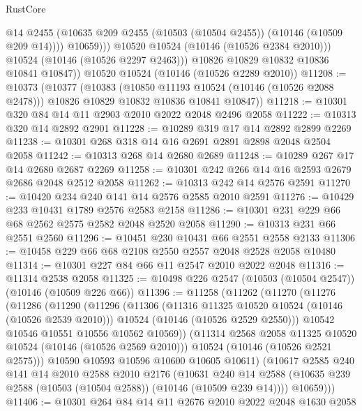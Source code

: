 \begin{lexlean}{RustCore}
\begin{coremodule}
                    @14
                    @2455
                    (@10635 @209 @2455 (@10503 (@10504 @2455)) (@10146 (@10509 @209 @14))))
                  @10659)))
            @10520
            @10524
            (@10146 (@10526 @2384 @2010)))
          @10524
          (@10146 (@10526 @2297 @2463)))
        @10826
        @10829
        @10832
        @10836
        @10841
        @10847))
    @10520
    @10524
    (@10146 (@10526 @2289 @2010))
@11208 := @10373
    (@10377
      (@10383
        (@10850 @11193 @10524 (@10146 (@10526 @2088 @2478)))
        @10826
        @10829
        @10832
        @10836
        @10841
        @10847))
@11218 := @10301 @320 @84 @14 @11 @2903 @2010 @2022 @2048 @2496 @2058
@11222 := @10313 @320 @14 @2892 @2901
@11228 := @10289 @319 @17 @14 @2892 @2899 @2269
@11238 := @10301 @268 @318 @14 @16 @2691 @2891 @2898 @2048 @2504 @2058
@11242 := @10313 @268 @14 @2680 @2689
@11248 := @10289 @267 @17 @14 @2680 @2687 @2269
@11258 := @10301 @242 @266 @14 @16 @2593 @2679 @2686 @2048 @2512 @2058
@11262 := @10313 @242 @14 @2576 @2591
@11270 := @10420 @234 @240 @141 @14 @2576 @2585 @2010 @2591
@11276 := @10429 @233 @10431 @1789 @2576 @2583 @2158
@11286 := @10301 @231 @229 @66 @68 @2562 @2575 @2582 @2048 @2520 @2058
@11290 := @10313 @231 @66 @2551 @2560
@11296 := @10451 @230 @10431 @66 @2551 @2558 @2133
@11306 := @10458 @229 @66 @68 @2108 @2550 @2557 @2048 @2528 @2058 @10480
@11314 := @10301 @227 @84 @66 @11 @2547 @2010 @2022 @2048
@11316 := @11314 @2538 @2058
@11325 := @10498 @226 @2547 (@10503 (@10504 @2547)) (@10146 (@10509 @226 @66))
@11396 := @11258
    (@11262
      (@11270
        (@11276
          (@11286
            (@11290
              (@11296
                (@11306
                  (@11316 @11325 @10520 @10524 (@10146 (@10526 @2539 @2010)))
                  @10524
                  (@10146 (@10526 @2529 @2550)))
                @10542
                @10546
                @10551
                @10556
                @10562
                @10569))
            (@11314 @2568 @2058 @11325 @10520 @10524 (@10146 (@10526 @2569 @2010)))
            @10524
            (@10146 (@10526 @2521 @2575)))
          @10590
          @10593
          @10596
          @10600
          @10605
          @10611)
        (@10617
          @2585
          @240
          @141
          @14
          @2010
          @2588
          @2010
          @2176
          (@10631
            @240
            @14
            @2588
            (@10635 @239 @2588 (@10503 (@10504 @2588)) (@10146 (@10509 @239 @14))))
          @10659)))
@11406 := @10301 @264 @84 @14 @11 @2676 @2010 @2022 @2048 @1630 @2058

\end{coremodule}
\end{lexlean}
